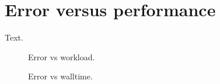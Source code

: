 \section{Error versus performance}
\label{sec:errorvsperformance}

Text.

\begin{figure}
\centering

\caption{Error vs workload.}
\label{fig:errorworkload}
\end{figure}

\begin{figure}
\centering

\caption{Error vs walltime.}
\label{fig:errorwalltime}
\end{figure}